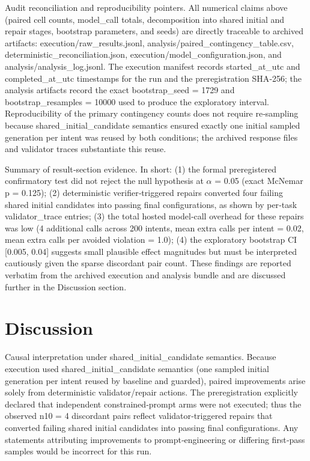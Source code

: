 \documentclass[conference]{IEEEtran}
\begin{document}
Audit reconciliation and reproducibility pointers. All numerical claims above (paired cell counts, model\_call totals, decomposition into shared initial and repair stages, bootstrap parameters, and seeds) are directly traceable to archived artifacts: execution/raw\_results.jsonl, analysis/paired\_contingency\_table.csv, deterministic\_reconciliation.json, execution/model\_configuration.json, and analysis/analysis\_log.jsonl. The execution manifest records started\_at\_utc and completed\_at\_utc timestamps for the run and the preregistration SHA‑256; the analysis artifacts record the exact bootstrap\_seed = 1729 and bootstrap\_resamples = 10000 used to produce the exploratory interval. Reproducibility of the primary contingency counts does not require re‑sampling because shared\_initial\_candidate semantics ensured exactly one initial sampled generation per intent was reused by both conditions; the archived response files and validator traces substantiate this reuse.

Summary of result‑section evidence. In short: (1) the formal preregistered confirmatory test did not reject the null hypothesis at \ensuremath{\alpha} = 0.05 (exact McNemar p = 0.125); (2) deterministic verifier‑triggered repairs converted four failing shared initial candidates into passing final configurations, as shown by per‑task validator\_trace entries; (3) the total hosted model‑call overhead for these repairs was low (4 additional calls across 200 intents, mean extra calls per intent = 0.02, mean extra calls per avoided violation = 1.0); (4) the exploratory bootstrap CI [0.005, 0.04] suggests small plausible effect magnitudes but must be interpreted cautiously given the sparse discordant pair count. These findings are reported verbatim from the archived execution and analysis bundle and are discussed further in the Discussion section.

\section{Discussion}
Causal interpretation under shared\_initial\_candidate semantics. Because execution used shared\_initial\_candidate semantics (one sampled initial generation per intent reused by baseline and guarded), paired improvements arise solely from deterministic validator/repair actions. The preregistration explicitly declared that independent constrained‑prompt arms were not executed; thus the observed n10 = 4 discordant pairs reflect validator‑triggered repairs that converted failing shared initial candidates into passing final configurations. Any statements attributing improvements to prompt‑engineering or differing first‑pass samples would be incorrect for this run.
\end{document}

